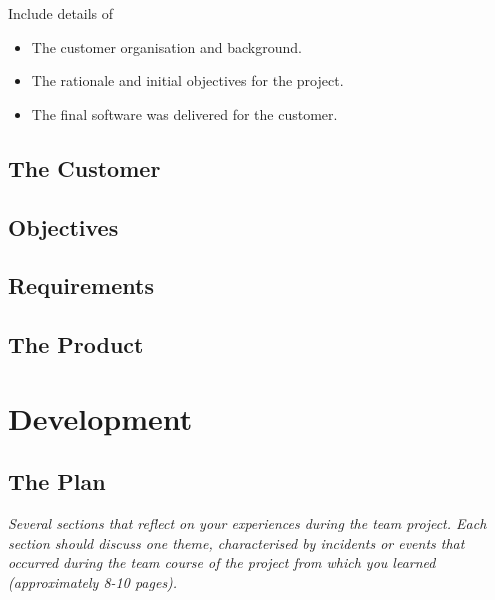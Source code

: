 \documentclass{l3proj}
\begin{document}
Include details of
\begin{itemize}
\item The customer organisation and background.
\item The rationale and initial objectives for the project.
\item The final software was delivered for the customer.
\end{itemize}

\subsection{The Customer}

\subsection{Objectives}

\subsection{Requirements}

\subsection{The Product}


\section{Development}

\subsection{The Plan}

\textit{Several sections that reflect on your experiences during the team project. Each section should discuss one theme, characterised by incidents or events that occurred during the team course of the project from which you learned (approximately 8-10 pages).}
\end{document}
